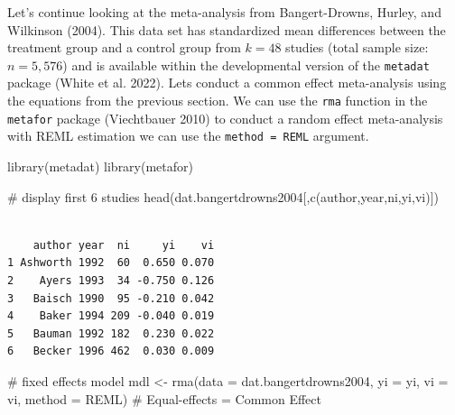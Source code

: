 \documentclass[
  letterpaper,
  DIV=11,
  numbers=noendperiod]{scrreprt}
\newenvironment{Shaded}{}{}
\newcommand{\AttributeTok}[1]{\textcolor[rgb]{0.00,0.34,0.68}{#1}}
\newcommand{\CommentTok}[1]{\textcolor[rgb]{0.54,0.53,0.53}{#1}}
\newcommand{\FunctionTok}[1]{\textcolor[rgb]{0.39,0.29,0.61}{#1}}
\newcommand{\NormalTok}[1]{\textcolor[rgb]{0.12,0.11,0.11}{#1}}
\newcommand{\OtherTok}[1]{\textcolor[rgb]{0.00,0.43,0.16}{#1}}
\newcommand{\StringTok}[1]{\textcolor[rgb]{0.75,0.01,0.01}{#1}}
\begin{document}
\begin{tcolorbox}[enhanced jigsaw, opacityback=0, coltitle=black, toprule=.15mm, colframe=quarto-callout-note-color-frame, bottomtitle=1mm, rightrule=.15mm, colbacktitle=quarto-callout-note-color!10!white, left=2mm, bottomrule=.15mm, breakable, title={Applied Example in R}, colback=white, opacitybacktitle=0.6, titlerule=0mm, arc=.35mm, leftrule=.75mm, toptitle=1mm]

Let's continue looking at the meta-analysis from Bangert-Drowns, Hurley,
and Wilkinson (2004). This data set has standardized mean differences
between the treatment group and a control group from \(k=48\) studies
(total sample size: \(n=5,576\)) and is available within the
developmental version of the \texttt{metadat} package (White et al.
2022). Lets conduct a common effect meta-analysis using the equations
from the previous section. We can use the \texttt{rma} function in the
\texttt{metafor} package (Viechtbauer 2010) to conduct a random effect
meta-analysis with REML estimation we can use the
\texttt{method\ =\ \textquotesingle{}REML\textquotesingle{}} argument.

\begin{Shaded}
\begin{Highlighting}[]
\FunctionTok{library}\NormalTok{(metadat)}
\FunctionTok{library}\NormalTok{(metafor)}

\CommentTok{\# display first 6 studies}
\FunctionTok{head}\NormalTok{(dat.bangertdrowns2004[,}\FunctionTok{c}\NormalTok{(}\StringTok{\textquotesingle{}author\textquotesingle{}}\NormalTok{,}\StringTok{\textquotesingle{}year\textquotesingle{}}\NormalTok{,}\StringTok{\textquotesingle{}ni\textquotesingle{}}\NormalTok{,}\StringTok{\textquotesingle{}yi\textquotesingle{}}\NormalTok{,}\StringTok{\textquotesingle{}vi\textquotesingle{}}\NormalTok{)])}
\end{Highlighting}
\end{Shaded}

\begin{verbatim}

    author year  ni     yi    vi 
1 Ashworth 1992  60  0.650 0.070 
2    Ayers 1993  34 -0.750 0.126 
3   Baisch 1990  95 -0.210 0.042 
4    Baker 1994 209 -0.040 0.019 
5   Bauman 1992 182  0.230 0.022 
6   Becker 1996 462  0.030 0.009 
\end{verbatim}

\begin{Shaded}
\begin{Highlighting}[]
\CommentTok{\# fixed effects model}
\NormalTok{mdl }\OtherTok{\textless{}{-}} \FunctionTok{rma}\NormalTok{(}\AttributeTok{data =}\NormalTok{ dat.bangertdrowns2004,}
           \AttributeTok{yi =}\NormalTok{ yi,}
           \AttributeTok{vi =}\NormalTok{ vi,}
           \AttributeTok{method =} \StringTok{\textquotesingle{}REML\textquotesingle{}}\NormalTok{) }\CommentTok{\# Equal{-}effects = Common Effect}


\end{Highlighting}
\end{Shaded}
\end{tcolorbox}
\end{document}

